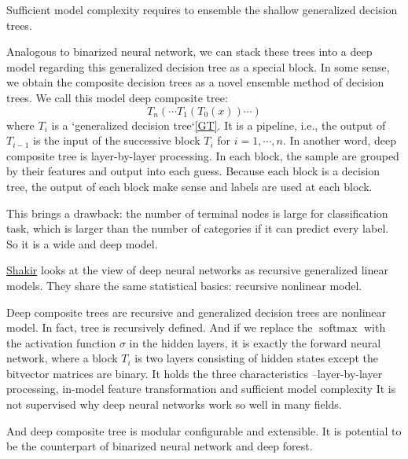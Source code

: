 \documentclass[UTF8]{article}
\begin{document}
Sufficient model complexity  requires to ensemble the shallow generalized decision trees.

Analogous to binarized neural network, we can stack these trees into a deep model
regarding this generalized decision tree as a special block.
In some sense, we obtain the composite decision trees
as a novel ensemble method of decision trees.
We call this model  deep composite tree:
\begin{equation}\label{DCT}
  T_n(\cdots T_1( T_0(x))\cdots)
\end{equation}
where $T_i$ is a `generalized decision tree`\eqref{GT}.
It is a pipeline,
i.e., the  output of $T_{i-1}$ is the input of the successive block $T_i$ for $i=1,\cdots, n$.
In another word, deep composite tree is layer-by-layer processing.
In each block, the sample are grouped by their features
and output into each guess.
Because each block is a decision tree,  the output of each block make sense
and labels are used at each block.

This brings a drawback:
the number of terminal nodes is large for classification task,
which is larger than the number of categories
if it can predict every label.
So it is a wide and deep model.

\href{http://blog.shakirm.com/ml-series/a-statistical-view-of-deep-learning/}{Shakir}
looks at the view of deep neural networks as recursive generalized linear models.
They share the same statistical basics: recursive nonlinear model.

Deep composite trees are recursive and
generalized decision trees are nonlinear model.
In fact, tree is recursively defined.
And  if we replace the $\operatorname{softmax}$ with the activation function $\sigma$
in the hidden layers, it is exactly the forward neural network,
where a block $T_i$  is two layers consisting of hidden states
except the bitvector matrices are binary.
It holds the three characteristics
--layer-by-layer processing, in-model feature transformation and sufficient model complexity
It is not supervised why deep neural networks work so well in many fields.


And deep composite tree is modular configurable and extensible.
It is potential to be the counterpart of binarized neural network and deep forest.
\end{document}
